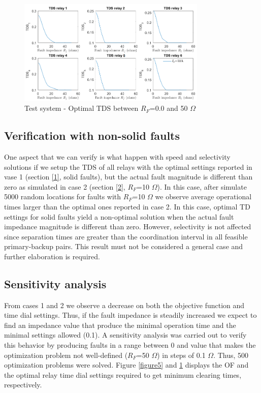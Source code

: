 \documentclass[letterpaper, 10 pt, conference]{IEEEtran}
\begin{document}
         \begin{figure}[t!] \centerline{
     \includegraphics[width=9.0cm]{images/TDS.png}}
       \caption{Test system - Optimal TDS between $R_F$=0.0 and 50 $\Omega$}
      \label{figure6}
        \end{figure}

\subsection{Verification with non-solid faults}\label{s3}

One aspect that we can verify is what happen with speed and selectivity solutions if we setup the TDS of all relays with the optimal settings reported in vase 1 (section \ref{1}, solid faults), but the actual fault magnitude is different than zero as simulated in case 2 (section \ref{2}, $R_F$=10 $\Omega$). In this case, after simulate 5000 random locations for faults with $R_F$=10 $\Omega$ we observe average operational times larger than the optimal ones reported in case 2. In this case, optimal TD settings for solid faults yield a non-optimal solution when the actual fault impedance magnitude is different than zero. However, selectivity is not affected since separation times are greater than the coordination interval in all feasible primary-backup pairs. This result must not be considered a general case and further elaboration is required.

\subsection{Sensitivity analysis }\label{3}

From cases 1 and 2 we observe a decrease on both the objective function and time dial settings. Thus, if the fault impedance is steadily increased we expect to find an impedance value that produce the minimal operation time and the minimal settings allowed (0.1). A sensitivity analysis  was carried out to verify this behavior by producing faults in a range
between 0 and value that makes the optimization problem not well-defined ($R_F$=50  $\Omega$) in steps of 0.1 $\Omega$. Thus, 500 optimization problems were solved. Figure \ref{figure5} and \ref{figure6} displays the OF and the optimal relay time dial settings required to get minimum clearing times, respectively.
\end{document}
